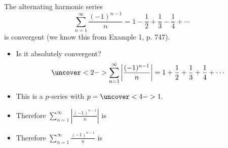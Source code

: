 \begin{frame}
\begin{example}[Example 2, p. 751]
The alternating harmonic series
\abovedisplayskip=0pt
\belowdisplayskip=0pt
\[
\sum_{n=1}^\infty \frac{(-1)^{n-1}}{n} = 1 - \frac{1}{2} + \frac{1}{3} - \frac{1}{4} + \cdots%
\]
is convergent (we know this from Example 1, p. 747).
\begin{itemize}
\item<2->  Is it absolutely convergent?
\[
\uncover<2->{%
\sum_{n=1}^\infty \left| \frac{(-1)^{n-1}}{n}\right|  = 1 + \frac{1}{2} + \frac{1}{3} + \frac{1}{4} + \cdots%
}%
\]
\item<3->  This is a $p$-series with \alert<handout:0| 3-4>{$p = \uncover<4->{1.}$}
\item<5->  Therefore $\sum_{n=1}^\infty \left|\frac{(-1)^{n-1}}{n}\right|$ is 
\item<5->  Therefore $\sum_{n=1}^\infty \frac{(-1)^{n-1}}{n}$ is 
\end{itemize}
\end{example}
\end{frame}

